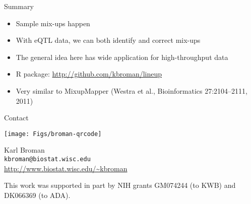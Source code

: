 \documentclass[final,plain]{beamer}
\newlength{\sepwid}
\newlength{\onecolwid}
\begin{document}
\begin{frame}[t]
\begin{columns}[t]
\begin{column}{\onecolwid}
    
    \begin{exampleblock}{\Large Summary}
      \begin{itemize}
        \itemsep18pt
        \item Sample mix-ups happen
        \item With eQTL data, we can both identify and {\color{nred}
  correct} mix-ups
        \item The general idea here has wide application for high-throughput data
        \item R package: \url{http://github.com/kbroman/lineup}
        \item Very similar to {\color{ngreen} MixupMapper} 
              (\small Westra et al., Bioinformatics 27:2104--2111, 2011)
      \end{itemize}
    \end{exampleblock}


\vspace{10mm} %

    \begin{block}{Contact}
\begin{center}      
      \begin{minipage}{5em}
    \texttt{[image: Figs/broman-qrcode]}
      \end{minipage}
      \begin{minipage}{22em}
      Karl Broman \hspace{3em}\\ {\tt kbroman@biostat.wisc.edu}\\
      \url{http://www.biostat.wisc.edu/~kbroman}
      \end{minipage}
\end{center}
    \end{block}
  

\vspace{5mm} %

{\rmfamily \footnotesize
\centerline{This work was supported in part by NIH grants GM074244 (to KWB) and
DK066369 (to ADA).}}
  



  \end{column}
  
\begin{column}{\sepwid} \end{column}                 %
  
\end{columns}


\end{frame}
\end{document}
